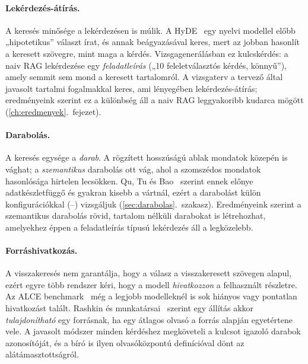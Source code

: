 \paragraph{Lekérdezés-átírás.} A keresés minősége a lekérdezésen is múlik. A HyDE~\cite{gao2023hyde} egy
nyelvi modellel előbb „hipotetikus” választ írat, és annak beágyazásával keres, mert az jobban hasonlít a
keresett szövegre, mint maga a kérdés. Vizsgagenerálásban ez kulcskérdés: a naiv RAG lekérdezése egy
\emph{feladatleírás} („10 feleletválasztós kérdés, könnyű”), amely semmit sem mond a keresett tartalomról.
A vizsgaterv a tervező által javasolt tartalmi fogalmakkal keres, ami lényegében lekérdezés-átírás;
eredményeink szerint ez a különbség áll a naiv RAG leggyakoribb kudarca mögött
(\ref{ch:eredmenyek}.~fejezet).

\paragraph{Darabolás.} A keresés egysége a \emph{darab}. A rögzített hosszúságú ablak mondatok közepén is
vághat; a \emph{szemantikus} darabolás ott vág, ahol a szomszédos mondatok hasonlósága hirtelen
lecsökken. Qu, Tu és Bao~\cite{qu2024chunking} szerint ennek előnye adatkészletfüggő és gyakran kisebb a
vártnál, ezért a darabolást külön konfigurációkkal (--) vizsgáljuk
(\ref{sec:darabolas}.~szakasz). Eredményeink szerint a szemantikus darabolás rövid, tartalom nélküli
darabokat is létrehozhat, amelyekhez éppen a feladatleírás típusú lekérdezés áll a legközelebb.

\paragraph{Forráshivatkozás.} A visszakeresés nem garantálja, hogy a válasz a visszakeresett szövegen
alapul, ezért egyre több rendszer kéri, hogy a modell \emph{hivatkozzon} a felhasznált részletre. Az ALCE
benchmark~\cite{gao2023alce} még a legjobb modelleknél is sok hiányos vagy pontatlan hivatkozást talált.
Rashkin és munkatársai~\cite{rashkin2023ais} szerint egy állítás akkor \emph{tulajdonítható} egy forrásnak,
ha egy átlagos olvasó a forrás alapján egyetértene vele. A javasolt módszer minden kérdéshez megköveteli a
kulcsot igazoló darabok azonosítóját, és a bíró is ilyen olvasóközpontú definícióval dönt az
alátámasztottságról.

